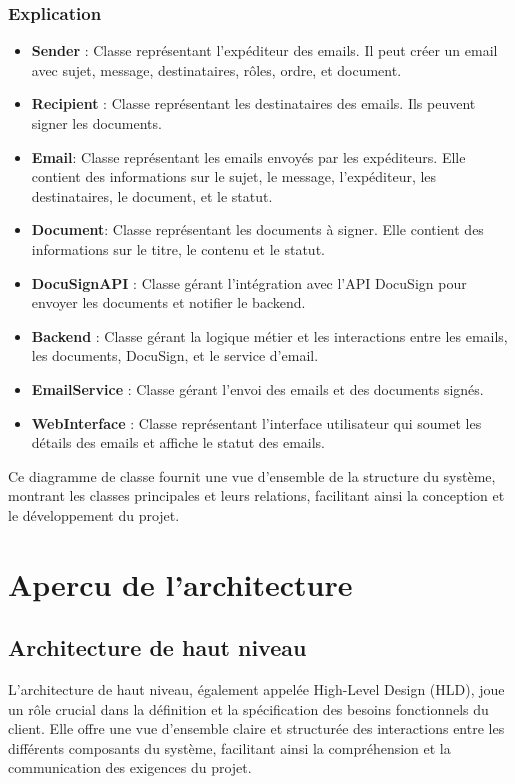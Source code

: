 \subsubsection{Explication}
\begin{itemize}

\item \textbf{Sender} : Classe représentant l'expéditeur des emails. Il peut créer un email avec sujet, message, destinataires, rôles, ordre, et document.
\item \textbf{Recipient} : Classe représentant les destinataires des emails. Ils peuvent signer les documents.
\item \textbf{Email}: Classe représentant les emails envoyés par les expéditeurs. Elle contient des informations sur le sujet, le message, l'expéditeur, les destinataires, le document, et le statut.
\item \textbf{Document}: Classe représentant les documents à signer. Elle contient des informations sur le titre, le contenu et le statut.
\item \textbf{DocuSignAPI} : Classe gérant l'intégration avec l'API DocuSign pour envoyer les documents et notifier le backend.
\item\textbf{Backend} : Classe gérant la logique métier et les interactions entre les emails, les documents, DocuSign, et le service d'email.
\item \textbf{EmailService} : Classe gérant l'envoi des emails et des documents signés.
\item \textbf{WebInterface} : Classe représentant l'interface utilisateur qui soumet les détails des emails et affiche le statut des emails.
\end{itemize}
Ce diagramme de classe fournit une vue d'ensemble de la structure du système, montrant les classes principales et leurs relations, facilitant ainsi la conception et le développement du projet.

\newpage

\section{Apercu de l’architecture}
\subsection{Architecture de haut niveau}


L’architecture de haut niveau, également appelée High-Level Design (HLD), joue un rôle crucial dans la définition et la spécification des besoins fonctionnels du client. Elle offre une vue d’ensemble claire et structurée des interactions entre les différents composants du système, facilitant ainsi la compréhension et la communication des exigences du projet.

